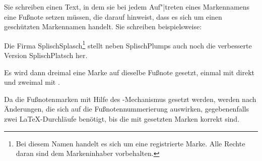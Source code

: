   \begin{Example}
    Sie schreiben einen Text, in dem sie bei jedem Auf"|treten eines
    Markennamens eine Fußnote setzen müssen, die darauf hinweist, dass es sich
    um einen geschützten Markennamen handelt. Sie schreiben beispielsweise:%
    \IfThisCommonLabelBase{maincls}{\iftrue}{\csname iffalse\endcsname}%
\begin{lstcode}
  Die Firma SplischSplasch\footnote{Bei diesem 
    Namen handelt es sich um eine registrierte
    Marke. Alle Rechte daran sind dem 
    Markeninhaber vorbehalten.\label{refnote}}
  stellt neben SplischPlumps
  auch noch die verbesserte Version 
  SplischPlatsch her.
\end{lstcode}
      Es wird dann dreimal eine Marke auf dieselbe Fußnote gesetzt, einmal mit
       direkt und zweimal mit
      .
    \else\iftrue
\begin{lstcode}
  Die Firma SplischSplasch\footnote{Bei diesem 
    Namen handelt es sich um eine registrierte
    Marke. Alle Rechte daran sind dem 
    Markeninhaber vorbehalten.\label{refnote}}
  stellt neben SplischPlumps\footref{refnote}
  auch noch die verbesserte Version 
  SplischPlatsch\footref{refnote} her.
\end{lstcode}
        Es wird dann dreimal eine Marke auf dieselbe Fußnote gesetzt, einmal
        mit \DescRef{\ThisCommonLabelBase.cmd.footnote} direkt und zweimal mit
        \Macro{footref}.
      \else
\begin{lstcode}
  Die Firma SplischSplasch\footnote{Bei diesem
    Namen handelt es sich um eine registrierte
    Marke. Alle Rechte daran sind dem 
    Markeninhaber, der Firma SplischSplasch,
    vorbehalten.\label{refnote}}
  stellt neben SplischPlumps\footref{refnote}
  auch noch die verbesserte Version 
  SplischPlatsch\footref{refnote} und das sehr
  beliebte 
  SplischSplaschPlumps\footref{refnote} her.
\end{lstcode}
        Es wird dann vier Mal eine Marke auf dieselbe Fußnote gesetzt, einmal
        mit \DescRef{\ThisCommonLabelBase.cmd.footnote} direkt und drei Mal
        mit \Macro{footref}.
      \fi%
    \fi
  \end{Example}
\fi
Da die Fußnotenmarken mit Hilfe des -Mechanismus gesetzt werden,
werden nach Änderungen, die sich auf die Fußnotennummerierung auswirken,
gegebenenfalls zwei \LaTeX-Durchläufe benötigt, bis die mit 
gesetzten Marken korrekt sind.%
%
\EndIndexGroup

